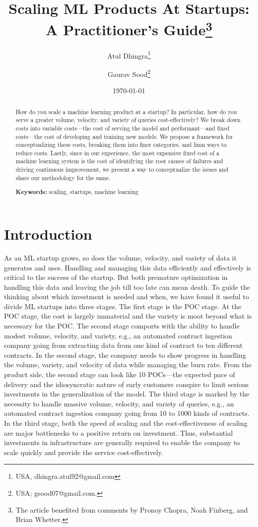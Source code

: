 \documentclass[12pt, letterpaper]{article}
\title{Scaling ML Products At Startups:\\ A Practitioner's Guide\thanks{The article benefited from comments by Pronoy Chopra, Noah Finberg, and Brian Whetter.}}
\author{Atul Dhingra\thanks{USA, \textsf{dhingra.atul92@gmail.com}} \and Gaurav Sood\thanks{USA;  \textsf{gsood07@gmail.com}.}}
\date{\today}
\begin{document}
\maketitle
\thispagestyle{empty}

\begin{abstract}

How do you scale a machine learning product at a startup? In particular, how do you serve a greater volume, velocity, and variety of queries cost-effectively? We break down costs into variable costs—the cost of serving the model and performant—and fixed costs—the cost of developing and training new models. We propose a framework for conceptualizing these costs, breaking them into finer categories, and limn ways to reduce costs. Lastly, since in our experience, the most expensive fixed cost of a machine learning system is the cost of identifying the root causes of failures and driving continuous improvement, we present a way to conceptualize the issues and share our methodology for the same.
\smallskip

\textbf{Keywords:} scaling, startups, machine learning

\end{abstract}

\section{Introduction}

As an ML startup grows, so does the volume, velocity, and variety of data it generates and uses. Handling and managing this data efficiently and effectively is critical to the success of the startup. But both premature optimization in handling this data and leaving the job till too late can mean death. To guide the thinking about which investment is needed and when, we have found it useful to divide ML startups into three stages. The first stage is the POC stage. At the POC stage, the cost is largely immaterial and the variety is moot beyond what is necessary for the POC. The second stage comports with the ability to handle modest volume, velocity, and variety, e.g., an automated contract ingestion company going from extracting data from one kind of contract to ten different contracts. In the second stage, the company needs to show progress in handling the volume, variety, and velocity of data while managing the burn rate. From the product side, the second stage can look like 10 POCs—the expected pace of delivery and the idiosyncratic nature of early customers conspire to limit serious investments in the generalization of the model. The third stage is marked by the necessity to handle massive volume, velocity, and variety of queries, e.g., an automated contract ingestion company going from 10 to 1000 kinds of contracts. In the third stage, both the speed of scaling and the cost-effectiveness of scaling are major bottlenecks to a positive return on investment. Thus, substantial investments in infrastructure are generally required to enable the company to scale quickly and provide the service cost-effectively.
\end{document}
